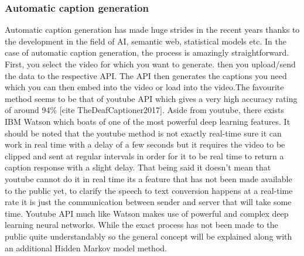 \documentclass[sigconf]{acmart}
\begin{document}
\subsubsection{Automatic caption generation}
Automatic caption generation has made huge strides in the recent years thanks to the development in the field of AI, semantic web, statistical models etc. In the case of automatic caption generation, the process is amazingly straightforward. First, you select the video for which you want to generate. then you upload/send the data to the respective API. The API then generates the captions you need which you can then embed into the video or load into the video.The favourite method seems to be that of youtube API which gives a very high accuracy rating of around 94\% [cite TheDeafCaptioner2017].  Aside from youtube, there exists IBM Watson which boats of one of the most powerful deep learning features. It should be noted that the youtube method is not exactly real-time sure it can work in real time with a delay of a few seconds but it requires the video to be clipped and sent at regular intervals in order for it to be real time to return a caption response with a slight delay. That being said it doesn't mean that youtube cannot do it in real time its a feature that has not been made available to the public yet, to clarify the speech to text conversion happens at a real-time rate it is just the communication between sender and server that will take some time. Youtube API much like Watson makes use of powerful and complex deep learning neural networks. While the exact process has not been made to the public quite understandably so the general concept will be explained along with an additional Hidden Markov model method.
\newline
\end{document}
